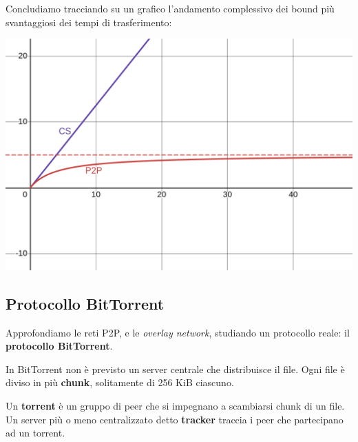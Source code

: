 \documentclass[a4paper,11pt]{article}
\begin{document}
\noindent
\begin{minipage}{\textwidth}
Concludiamo tracciando su un grafico l'andamento complessivo dei bound più svantaggiosi dei tempi di trasferimento:
\begin{center}
	\includegraphics[scale=0.3]{../figures/cs_p2p_ft.png}
\end{center}
\end{minipage}

\subsection{Protocollo BitTorrent}
Approfondiamo le reti P2P, e le \textit{overlay network}, studiando un protocollo reale: il \textbf{protocollo BitTorrent}.

In BitTorrent non è previsto un server centrale che distribuisce il file.
Ogni file è diviso in più \textbf{chunk}, solitamente di 256 KiB ciascuno.

Un \textbf{torrent} è un gruppo di peer che si impegnano a scambiarsi chunk di un file.
Un server più o meno centralizzato detto \textbf{tracker} traccia i peer che partecipano ad un torrent.
\end{document}
